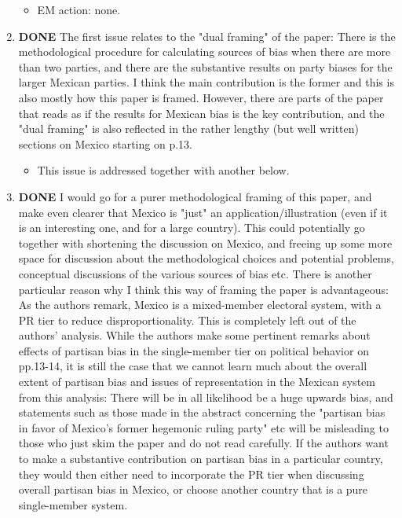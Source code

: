 \documentclass{article}
\begin{document}
\begin{enumerate}
\label{sec:orgheadline4}
\begin{itemize}
\item EM action: none.
\end{itemize}
\item {\bfseries\sffamily DONE} The first issue relates to the "dual framing" of the paper: There is the methodological procedure for calculating sources of bias when there are more than two parties, and there are the substantive results on party biases for the larger Mexican parties. I think the main contribution is the former and this is also mostly how this paper is framed. However, there are parts of the paper that reads as if the results for Mexican bias is the key contribution, and the "dual framing" is also reflected in the rather lengthy (but well written) sections on Mexico starting on p.13.
\label{sec:orgheadline5}
\begin{itemize}
\item This issue is addressed together with another below.
\end{itemize}
\item {\bfseries\sffamily DONE} I would go for a purer methodological framing of this paper, and make even clearer that Mexico is "just" an application/illustration (even if it is an interesting one, and for a large country). This could potentially go together with shortening the discussion on Mexico, and  freeing up some more space for discussion about the methodological choices and potential problems, conceptual discussions of the various sources of bias etc. There is another particular reason why I think this way of framing the paper is advantageous: As the authors remark, Mexico is a mixed-member electoral system, with a PR tier to reduce disproportionality. This is completely left out of the authors' analysis. While the authors make some pertinent remarks about effects of partisan bias in the single-member tier on political behavior on pp.13-14, it is still the case that we cannot learn much about the overall extent of partisan bias and issues of representation in the Mexican system from this analysis: There will be in all likelihood be a huge upwards bias, and statements such as those made in the abstract concerning the "partisan bias in favor of Mexico's former hegemonic ruling party" etc will be misleading to those who just skim the paper and do not read carefully. If the authors want to make a substantive contribution on partisan bias in a particular country, they would then either need to incorporate the PR tier when discussing overall partisan bias in Mexico, or choose another country  that is a pure single-member system.

\end{enumerate}
\end{document}
